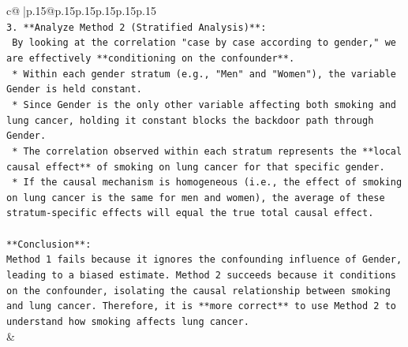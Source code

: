 \documentclass{article}
\begin{document}
{\begin{supertabular}{c@{$\;$}|p{.15\linewidth}@{}p{.15\linewidth}p{.15\linewidth}p{.15\linewidth}p{.15\linewidth}p{.15\linewidth}}
{{{\\ 
\texttt{3.  **Analyze Method 2 (Stratified Analysis)**:} \\
\texttt{    By looking at the correlation "case by case according to gender," we are effectively **conditioning on the confounder**.} \\
\texttt{    *   Within each gender stratum (e.g., "Men" and "Women"), the variable Gender is held constant.} \\
\texttt{    *   Since Gender is the only other variable affecting both smoking and lung cancer, holding it constant blocks the backdoor path through Gender.} \\
\texttt{    *   The correlation observed within each stratum represents the **local causal effect** of smoking on lung cancer for that specific gender.} \\
\texttt{    *   If the causal mechanism is homogeneous (i.e., the effect of smoking on lung cancer is the same for men and women), the average of these stratum{-}specific effects will equal the true total causal effect.} \\
\\ 
\texttt{**Conclusion**:} \\
\texttt{Method 1 fails because it ignores the confounding influence of Gender, leading to a biased estimate. Method 2 succeeds because it conditions on the confounder, isolating the causal relationship between smoking and lung cancer. Therefore, it is **more correct** to use Method 2 to understand how smoking affects lung cancer.} \\
            }
        }
    }
    & \\ \\


\end{supertabular}}
\end{document}
